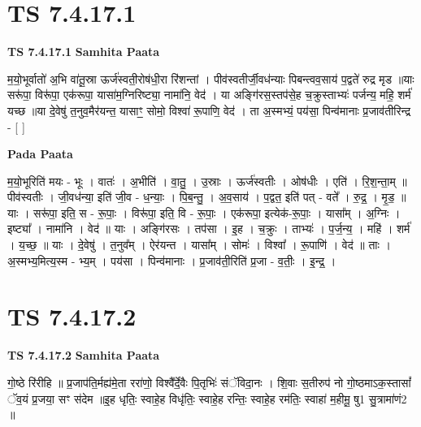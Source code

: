 \documentclass[17pt]{extarticle}
\begin{document}
\section*{ TS 7.4.17.1 }

\textbf{TS 7.4.17.1 } \newline
\textbf{Samhita Paata} \newline

म॒यो॒भूर्वातो॑ अ॒भि वा॑तू॒स्रा ऊर्ज॑स्वती॒रोष॑धी॒रा रि॑शन्तां । पीव॑स्वतीर्जी॒वध॑न्याः पिबन्त्वव॒साय॑ प॒द्वते॑ रुद्र मृड ॥याः सरू॑पा॒ विरू॑पा॒ एक॑रूपा॒ यासा॑म॒ग्निरिष्ट्या॒ नामा॑नि॒ वेद॑ । या अङ्गि॑रस॒स्तप॑से॒ह च॒क्रुस्ताभ्यः॑ पर्जन्य॒ महि॒ शर्म॑ यच्छ ॥या दे॒वेषु॑ त॒नुव॒मैर॑यन्त॒ यासाꣳ॒॒ सोमो॒ विश्वा॑ रू॒पाणि॒ वेद॑ । ता अ॒स्मभ्यं॒ पय॑सा॒ पिन्व॑मानाः प्र॒जाव॑तीरिन्द्र - [  ] \newline

\textbf{Pada Paata} \newline

म॒यो॒भूरिति॑ मयः - भूः । वातः॑ । अ॒भीति॑ । वा॒तु॒ । उ॒स्राः । ऊर्ज॑स्वतीः । ओष॑धीः । एति॑ । रि॒श॒न्ता॒म् ॥ पीव॑स्वतीः । जी॒वध॑न्या॒ इति॑ जी॒व - ध॒न्याः॒ । पि॒ब॒न्तु॒ । अ॒व॒साय॑ । प॒द्वत॒ इति॑ पत् - वते᳚ । रु॒द्र॒ । मृ॒ड॒ ॥ याः । सरू॑पा॒ इति॒ स - रू॒पाः॒ । विरू॑पा॒ इति॒ वि - रू॒पाः॒ । एक॑रूपा॒ इत्येक॑-रू॒पाः॒ । यासा᳚म् । अ॒ग्निः । इष्ट्या᳚ । नामा॑नि । वेद॑ ॥ याः । अङ्गि॑रसः । तप॑सा । इ॒ह । च॒क्रुः । ताभ्यः॑ । प॒र्ज॒न्य॒ । महि॑ । शर्म॑ । य॒च्छ॒ ॥ याः । दे॒वेषु॑ । त॒नुव᳚म् । ऐर॑यन्त । यासा᳚म् । सोमः॑ । विश्वा᳚ । रू॒पाणि॑ । वेद॑ ॥ ताः । अ॒स्मभ्य॒मित्य॒स्म - भ्य॒म् । पय॑सा । पिन्व॑मानाः । प्र॒जाव॑ती॒रिति॑ प्र॒जा - व॒तीः॒ । इ॒न्द्र॒ ।  \newline




\section*{ TS 7.4.17.2 }

\textbf{TS 7.4.17.2 } \newline
\textbf{Samhita Paata} \newline

गो॒ष्ठे रि॑रीहि ॥ प्र॒जाप॑ति॒र्मह्य॑मे॒ता ररा॑णो॒ विश्वै᳚र्दे॒वैः पि॒तृभिः॑ संॅविदा॒नः । शि॒वाः स॒तीरुप॑ नो गो॒ष्ठमाऽक॒स्तासां᳚ ॅव॒यं प्र॒जया॒ सꣳ स॑देम ॥इ॒ह धृतिः॒ स्वाहे॒ह विधृ॑तिः॒ स्वाहे॒ह रन्तिः॒ स्वाहे॒ह रम॑तिः॒ स्वाहा॑ म॒हीमू॒ षु1 सु॒त्रामा॑णं2 ॥ \newline
\end{document}
